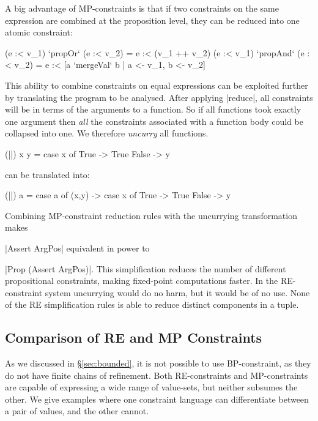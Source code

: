 \documentclass[preprint]{sigplanconf}
\begin{document}
A big advantage of MP-constraints is that if two constraints on the same expression are combined at the proposition level, they can be reduced into one atomic constraint:

\ignore\begin{code}
(e :< v_1)  `propOr`   (e :< v_2) = e :< (v_1 ++ v_2)
(e :< v_1)  `propAnd`  (e :< v_2) = e :< [a `mergeVal` b | a <- v_1, b <- v_2]
\end{code}

\noindent This ability to combine constraints on equal expressions can be exploited further by translating the program to be analysed. After applying |reduce|, all constraints will be in terms of the arguments to a function. So if all functions took exactly one argument then \textit{all} the constraints associated with a function body could be collapsed into one. We therefore \textit{uncurry} all functions.

\begin{example}
\begin{code}
(||) x y = case  x of
                 True   -> True
                 False  -> y
\end{code}

\noindent can be translated into:

\begin{code}
(||) a = case  a of
               (x,y) -> case  x of
                              True    -> True
                              False   -> y
\end{code}\codeexample
\end{example}

Combining MP-constraint reduction rules with the uncurrying transformation makes \ignore|Assert ArgPos| equivalent in power to \ignore|Prop (Assert ArgPos)|. This simplification reduces the number of different propositional constraints, making fixed-point computations faster. In the RE-constraint system uncurrying would do no harm, but it would be of no use. None of the RE simplification rules is able to reduce distinct components in a tuple.

\subsection{Comparison of RE and MP Constraints}

As we discussed in \S\ref{sec:bounded}, it is not possible to use BP-constraint, as they do not have finite chains of refinement. Both RE-constraints and MP-constraints are capable of expressing a wide range of value-sets, but neither subsumes the other. We give examples where one constraint language can differentiate between a pair of values, and the other cannot.
\end{document}
